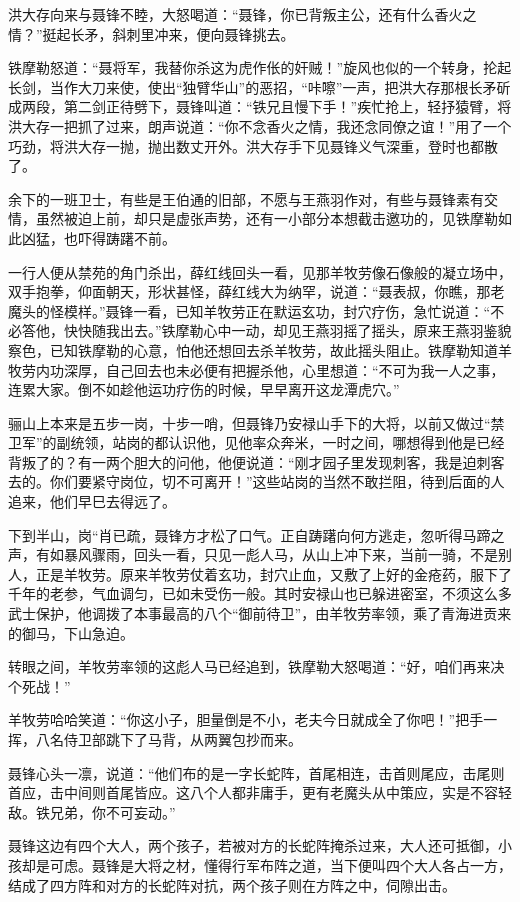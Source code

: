 \documentclass[12pt,oneside]{book}
\begin{document}
洪大存向来与聂锋不睦，大怒喝道：``聂锋，你已背叛主公，还有什么香火之情？''挺起长矛，斜刺里冲来，便向聂锋挑去。

铁摩勒怒道：``聂将军，我替你杀这为虎作伥的奸贼！''旋风也似的一个转身，抡起长剑，当作大刀来使，使出``独臂华山''的恶招，``咔嚓''一声，把洪大存那根长矛斫成两段，第二剑正待劈下，聂锋叫道：``铁兄且慢下手！''疾忙抢上，轻抒猿臂，将洪大存一把抓了过来，朗声说道：``你不念香火之情，我还念同僚之谊！''用了一个巧劲，将洪大存一抛，抛出数丈开外。洪大存手下见聂锋义气深重，登时也都散了。

余下的一班卫士，有些是王伯通的旧部，不愿与王燕羽作对，有些与聂锋素有交情，虽然被迫上前，却只是虚张声势，还有一小部分本想截击邀功的，见铁摩勒如此凶猛，也吓得踌躇不前。

一行人便从禁苑的角门杀出，薛红线回头一看，见那羊牧劳像石像般的凝立场中，双手抱拳，仰面朝天，形状甚怪，薛红线大为纳罕，说道：``聂表叔，你瞧，那老魔头的怪模样。''聂锋一看，已知羊牧劳正在默运玄功，封穴疗伤，急忙说道：``不必答他，快快随我出去。''铁摩勒心中一动，却见王燕羽摇了摇头，原来王燕羽鉴貌察色，已知铁摩勒的心意，怕他还想回去杀羊牧劳，故此摇头阻止。铁摩勒知道羊牧劳内功深厚，自己回去也未必便有把握杀他，心里想道：``不可为我一人之事，连累大家。倒不如趁他运功疗伤的时候，早早离开这龙潭虎穴。''

骊山上本来是五步一岗，十步一哨，但聂锋乃安禄山手下的大将，以前又做过``禁卫军''的副统领，站岗的都认识他，见他率众奔米，一时之间，哪想得到他是已经背叛了的？有一两个胆大的问他，他便说道：``刚才园子里发现刺客，我是迫刺客去的。你们要紧守岗位，切不可离开！''这些站岗的当然不敢拦阻，待到后面的人追来，他们早巳去得远了。

下到半山，岗``肖已疏，聂锋方才松了口气。正自踌躇向何方逃走，忽听得马蹄之声，有如暴风骤雨，回头一看，只见一彪人马，从山上冲下来，当前一骑，不是别人，正是羊牧劳。原来羊牧劳仗着玄功，封穴止血，又敷了上好的金疮药，服下了千年的老参，气血调匀，已如未受伤一般。其时安禄山也已躲进密室，不须这么多武士保护，他调拨了本事最高的八个``御前待卫''，由羊牧劳率领，乘了青海进贡来的御马，下山急迫。

转眼之间，羊牧劳率领的这彪人马已经追到，铁摩勒大怒喝道：``好，咱们再来决个死战！''

羊牧劳哈哈笑道：``你这小子，胆量倒是不小，老夫今日就成全了你吧！''把手一挥，八名侍卫部跳下了马背，从两翼包抄而来。

聂锋心头一凛，说道：``他们布的是一字长蛇阵，首尾相连，击首则尾应，击尾则首应，击中间则首尾皆应。这八个人都非庸手，更有老魔头从中策应，实是不容轻敌。铁兄弟，你不可妄动。''

聂锋这边有四个大人，两个孩子，若被对方的长蛇阵掩杀过来，大人还可抵御，小孩却是可虑。聂锋是大将之材，懂得行军布阵之道，当下便叫四个大人各占一方，结成了四方阵和对方的长蛇阵对抗，两个孩子则在方阵之中，伺隙出击。
\end{document}

